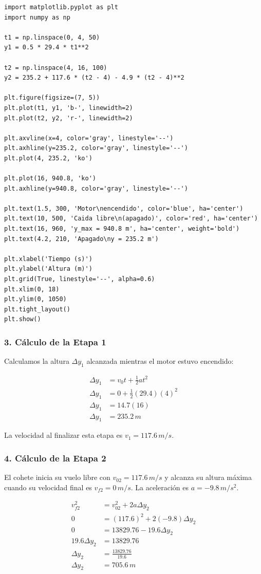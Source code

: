 \documentclass[12pt, a4paper]{article}
\begin{document}
\begin{lstlisting}
import matplotlib.pyplot as plt
import numpy as np

t1 = np.linspace(0, 4, 50)
y1 = 0.5 * 29.4 * t1**2

t2 = np.linspace(4, 16, 100)
y2 = 235.2 + 117.6 * (t2 - 4) - 4.9 * (t2 - 4)**2

plt.figure(figsize=(7, 5))
plt.plot(t1, y1, 'b-', linewidth=2)
plt.plot(t2, y2, 'r-', linewidth=2)

plt.axvline(x=4, color='gray', linestyle='--')
plt.axhline(y=235.2, color='gray', linestyle='--')
plt.plot(4, 235.2, 'ko')

plt.plot(16, 940.8, 'ko')
plt.axhline(y=940.8, color='gray', linestyle='--')

plt.text(1.5, 300, 'Motor\nencendido', color='blue', ha='center')
plt.text(10, 500, 'Caida libre\n(apagado)', color='red', ha='center')
plt.text(16, 960, 'y_max = 940.8 m', ha='center', weight='bold')
plt.text(4.2, 210, 'Apagado\ny = 235.2 m')

plt.xlabel('Tiempo (s)')
plt.ylabel('Altura (m)')
plt.grid(True, linestyle='--', alpha=0.6)
plt.xlim(0, 18)
plt.ylim(0, 1050)
plt.tight_layout()
plt.show()
\end{lstlisting}

\subsubsection*{3. Cálculo de la Etapa 1}
Calculamos la altura $\Delta y_1$ alcanzada mientras el motor estuvo encendido:

\begin{align*}
\Delta y_1 &= v_0t + \frac{1}{2}at^2 \\
\Delta y_1 &= 0 + \frac{1}{2}(29.4)(4)^2 \\
\Delta y_1 &= 14.7(16) \\
\Delta y_1 &= 235.2 \, \si{m}
\end{align*}

La velocidad al finalizar esta etapa es $v_1 = 117.6 \, \si{m/s}$.

\subsubsection*{4. Cálculo de la Etapa 2}
El cohete inicia su vuelo libre con $v_{02} = 117.6 \, \si{m/s}$ y alcanza su altura máxima cuando su velocidad final es $v_{f2} = 0 \, \si{m/s}$. La aceleración es $a = -9.8 \, \si{m/s^2}$.

\begin{align*}
v_{f2}^2 &= v_{02}^2 + 2a\Delta y_2 \\
0 &= (117.6)^2 + 2(-9.8)\Delta y_2 \\
0 &= 13829.76 - 19.6\Delta y_2 \\
19.6\Delta y_2 &= 13829.76 \\
\Delta y_2 &= \frac{13829.76}{19.6} \\
\Delta y_2 &= 705.6 \, \si{m}
\end{align*}
\end{document}
